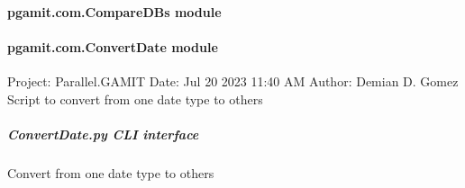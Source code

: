 \documentclass[letterpaper,10pt,english]{sphinxmanual}
\begin{document}
\paragraph{pgamit.com.CompareDBs module}
\label{\detokenize{pgamit.com:module-pgamit.com.CompareDBs}}\label{\detokenize{pgamit.com:pgamit-com-comparedbs-module}}

\begin{fulllineitems}
\label{\detokenize{pgamit.com:pgamit.com.CompareDBs.main}}
\pysigstartsignatures
\pysiglinewithargsret
{}
{}
{}
\pysigstopsignatures
\end{fulllineitems}



\paragraph{pgamit.com.ConvertDate module}
\label{\detokenize{pgamit.com:module-pgamit.com.ConvertDate}}\label{\detokenize{pgamit.com:pgamit-com-convertdate-module}}
\sphinxAtStartPar
Project: Parallel.GAMIT
Date: Jul 20 2023 11:40 AM
Author: Demian D. Gomez
Script to convert from one date type to others

\begin{fulllineitems}
\label{\detokenize{pgamit.com:pgamit.com.ConvertDate.main}}
\pysigstartsignatures
\pysiglinewithargsret
{}
{}
{}
\pysigstopsignatures
\end{fulllineitems}



\subparagraph{ConvertDate.py \sphinxhyphen{} CLI interface}
\label{\detokenize{pgamit.com:ConvertDate.py---CLI-interface}}
\sphinxAtStartPar
Convert from one date type to others

\begin{sphinxVerbatim}[commandchars=\\\{\}]
 \PYG{p}{[}\PYG{p}{]}   
\end{sphinxVerbatim}
\end{document}
